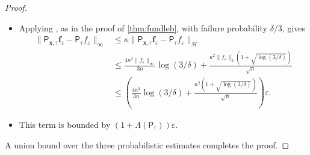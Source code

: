 \documentclass{article}
\let\cite\citep
\numberwithin{theorem}{section}
\theoremstyle{definition}
\newcommand{\fwithin}{f_\star}
\newcommand{\Hs}{\mathcal H}
\begin{document}
\begin{proof}
\begin{itemize}
    This means that
    \begin{align*}
        \sigma_{\bm x,\tau}(x)^2 &=\overline{\bm \phi}(x)^\top\left(\frac{1}{\tau}\widehat \Sigma+I\right)^{-1}\overline{\bm \phi}(x)\\
        &=\tau\overline{\bm \phi}(x)^\top\left(\widehat \Sigma+\tau I\right)^{-1}\overline{\bm \phi}(x)\\
        &=\tau \overline{\bm \phi}(x)^\top(\Sigma+\tau I)^{-1/2}M_n(\Sigma+\tau I)^{-1/2}\overline{\bm \phi}(x)\\
        &\le 2\tau \overline{\bm \phi}(x)^\top\left(\Sigma+\tau I\right)^{-1}\overline{\bm \phi}(x)\\
        &=2\tau \sum_{i=1}^\infty \frac{\mu_i\phi_i(x)^2}{\tau+\mu_i}\\
        &=2\tau\sum_{i=1}^\infty \frac{\mu_i}{\tau+\mu_i}=2\tau d_\text{eff}(k|\tau).
    \end{align*}
    Therefore,
    $$T1\le \left(2R\sqrt{\log(6/\delta)}+\sqrt{n\tau}\|\fwithin\|_\Hs\right)\sqrt{\frac{2d_\text{eff}(k|\tau)}{n}}.$$
    
    \item [(T2)] Applying \cite{liu2023estimation}, as in the proof of \cref{thm:fundleb}, with failure probability $\delta/3$, gives
    \begin{align*}\|\mathsf{P}_{\bm x,\tau}\bm f_\varepsilon-\mathsf{P}_{\tau}f_\varepsilon\|_\infty
        &\le \kappa \|\mathsf{P}_{\bm x,\tau}\bm f_\varepsilon-\mathsf{P}_{\tau}f_\varepsilon\|_\Hs\\
        &\le \frac{4\kappa^2 \|f_\varepsilon\|_\infty}{3n}\log(3/\delta)+\frac{\kappa^2 \|f_\varepsilon\|_2(1+\sqrt{\log(3/\delta)})}{\sqrt n}\\
        &\le \left(\frac{4\kappa^2}{3n}\log(3/\delta)+\frac{\kappa^2 (1+\sqrt{\log(3/\delta)})}{\sqrt n}\right)\varepsilon.
    \end{align*}
        \item [(T3)] This term is bounded by $(1+\Lambda(\mathsf{P}_{\tau}))\varepsilon.$
    \end{itemize}
    A union bound over the three probabilistic estimates completes the proof.
\end{proof}
\end{document}
